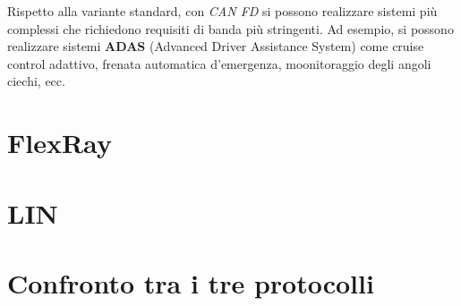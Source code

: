 Rispetto alla variante standard, con \emph{CAN FD} si possono realizzare sistemi più complessi che richiedono requisiti di banda più stringenti. Ad esempio, si possono realizzare sistemi \textbf{ADAS} (Advanced Driver Assistance System) come cruise control adattivo, frenata automatica d'emergenza, moonitoraggio degli angoli ciechi, ecc. \cite{css_electronics_canfd}

\section{FlexRay}

\section{LIN}

\section{Confronto tra i tre protocolli}

\newpage
